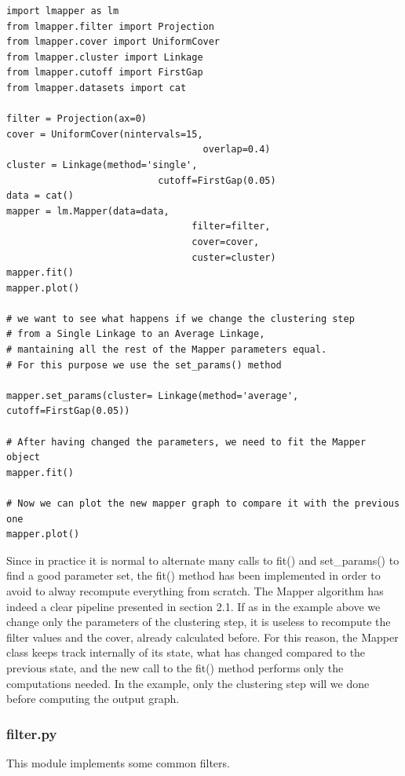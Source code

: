 \begin{lstlisting}[style=mystyle, deletekeywords={filter}]
import lmapper as lm
from lmapper.filter import Projection
from lmapper.cover import UniformCover
from lmapper.cluster import Linkage
from lmapper.cutoff import FirstGap
from lmapper.datasets import cat

filter = Projection(ax=0)
cover = UniformCover(nintervals=15,
								   overlap=0.4)
cluster = Linkage(method='single',
						   cutoff=FirstGap(0.05)
data = cat()
mapper = lm.Mapper(data=data,
								 filter=filter,
								 cover=cover,
								 custer=cluster)
mapper.fit()
mapper.plot()

# we want to see what happens if we change the clustering step
# from a Single Linkage to an Average Linkage,
# mantaining all the rest of the Mapper parameters equal. 
# For this purpose we use the set_params() method

mapper.set_params(cluster= Linkage(method='average', cutoff=FirstGap(0.05))

# After having changed the parameters, we need to fit the Mapper object
mapper.fit()

# Now we can plot the new mapper graph to compare it with the previous one
mapper.plot()
\end{lstlisting}

Since in practice it is normal to alternate many calls to fit() and set\_params() to find a good parameter set, the fit() method has been implemented in order to avoid to alway recompute everything from scratch. The Mapper algorithm has indeed a clear pipeline presented in section 2.1. If as in the example above we change only the parameters of the clustering step, it is useless to recompute the filter values and the cover, already calculated before. For this reason, the Mapper class keeps track internally of its state, what has changed compared to the previous state, and the new call to the fit() method performs only the computations needed. In the example, only the clustering step will we done before computing the output graph.

\subsubsection{filter.py}
This module implements some common filters.
